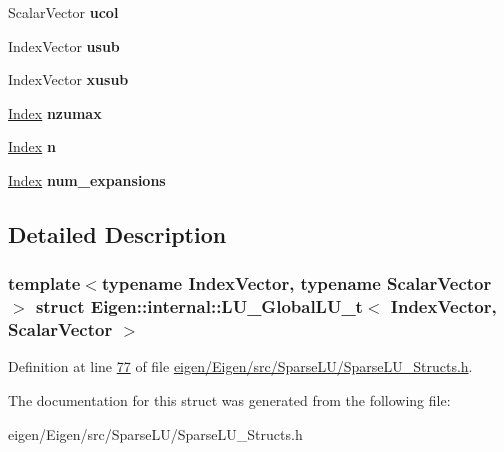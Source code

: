 \begin{DoxyCompactItemize}
\mbox{\label{struct_eigen_1_1internal_1_1_l_u___global_l_u__t_af5f3150def3deeb6a33ebf103edf922d}} 
Scalar\+Vector {\bfseries ucol}
\item 
\mbox{\label{struct_eigen_1_1internal_1_1_l_u___global_l_u__t_a16dc1f0c4a71bf3b3103a5904b78315e}} 
Index\+Vector {\bfseries usub}
\item 
\mbox{\label{struct_eigen_1_1internal_1_1_l_u___global_l_u__t_a7cd8881255f436f03f884a906a518629}} 
Index\+Vector {\bfseries xusub}
\item 
\mbox{\label{struct_eigen_1_1internal_1_1_l_u___global_l_u__t_a439ab1e27ba17b4927400fa3d267d7d6}} 
\hyperlink{namespace_eigen_a62e77e0933482dafde8fe197d9a2cfde}{Index} {\bfseries nzumax}
\item 
\mbox{\label{struct_eigen_1_1internal_1_1_l_u___global_l_u__t_ac98d9456d96233aee164a89ad28a06cb}} 
\hyperlink{namespace_eigen_a62e77e0933482dafde8fe197d9a2cfde}{Index} {\bfseries n}
\item 
\mbox{\label{struct_eigen_1_1internal_1_1_l_u___global_l_u__t_a60a04e15aa2821a3a2a50fd6c1683957}} 
\hyperlink{namespace_eigen_a62e77e0933482dafde8fe197d9a2cfde}{Index} {\bfseries num\+\_\+expansions}
\end{DoxyCompactItemize}


\subsection{Detailed Description}
\subsubsection*{template$<$typename Index\+Vector, typename Scalar\+Vector$>$\newline
struct Eigen\+::internal\+::\+L\+U\+\_\+\+Global\+L\+U\+\_\+t$<$ Index\+Vector, Scalar\+Vector $>$}



Definition at line \hyperlink{eigen_2_eigen_2src_2_sparse_l_u_2_sparse_l_u___structs_8h_source_l00077}{77} of file \hyperlink{eigen_2_eigen_2src_2_sparse_l_u_2_sparse_l_u___structs_8h_source}{eigen/\+Eigen/src/\+Sparse\+L\+U/\+Sparse\+L\+U\+\_\+\+Structs.\+h}.



The documentation for this struct was generated from the following file\+:\begin{DoxyCompactItemize}
\item 
eigen/\+Eigen/src/\+Sparse\+L\+U/\+Sparse\+L\+U\+\_\+\+Structs.\+h\end{DoxyCompactItemize}
